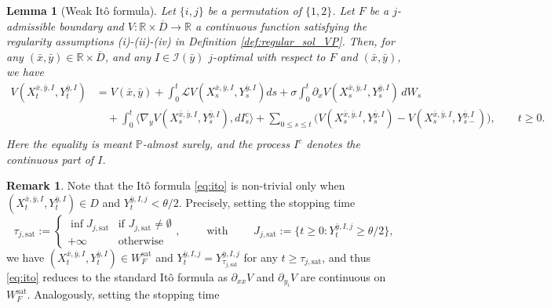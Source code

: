 \documentclass[10pt]{article}
\numberwithin{equation}{section}
\theoremstyle{plain}
\numberwithin{theorem}{section}
\newtheorem{lemma}[theorem]{Lemma}                              %
\theoremstyle{definition}
\newtheorem{remark}[theorem]{Remark}
\def \R {\mathbb{R}}
\newcommand{\<}{\langle}
\renewcommand{\>}{\rangle}
\renewcommand{\(}{\left(}
\renewcommand{\)}{\right)}
\newcommand\Pb{\mathbb{P}}
\def \R  {{\mathbb {R}}}
\def \R {{\mathbb {R}}}
\def\cI{{\mathcal I}}
\def\cL{{\mathcal L}}
\begin{document}
{{{\begin{lemma}[Weak It\^o formula]\label{lem:ito}
Let $\{i,j\}$ be a permutation of $\{ 1,2 \}$. Let $F$ be a $j$-admissible boundary and $V:\R\times \overline{D} \to \R$ a continuous function satisfying the regularity assumptions (i)-(ii)-{(iv)} in Definition \ref{def:regular_sol_VP}. Then, for any $(\bar x, \bar y)\in \R\times \overline{D}$, and any $I\in \cI(\bar y)$ {$j$-optimal with respect to $F$ and $(\bar x, \bar y)$}, we have
\begin{align}
 V(X^{\bar x,\bar y,I}_t, Y^{\bar y,I}_t) & = V({\bar x,\bar y}) + \int_{0}^t \cL V (X^{\bar{x},\bar{y},I}_s , Y^{\bar{y},I}_s ) ds + \sigma \int_0^t \partial_x V (X^{\bar{x},\bar{y},I}_s , Y^{\bar{y},I}_s )\, d W_s \\
& \quad + \int_0^t \big\langle \nabla_y V (X^{\bar{x},\bar{y},I}_s , Y^{\bar{y},I}_s ) , d I^c_s \big\rangle + \sum_{
{0\le s\le t}} \big( V (X^{\bar{x},\bar{y},I}_s , Y^{\bar{y},I}_s ) - V (X^{\bar{x},\bar{y},I}_s , Y^{\bar{y},I}_{s-} )  \big) , \qquad t\geq 0. \\
\label{eq:ito}
\end{align}
Here the equality is meant $\Pb$-almost surely, and the process $I^c$ denotes the continuous part of $I$.
\end{lemma}
\begin{remark}\label{rem:ito}
Note that the It\^o formula \eqref{eq:ito} is non-trivial only when $(X_t^{\bar x,\bar y,I},Y_t^{\bar y,I})\in D$ and $Y_t^{\bar y,I,j}<\theta/2$. Precisely, 
setting the stopping time
\begin{equation}\label{eq:tausat}
\tau_{j,\text{sat}}:=\begin{cases} 
\inf J_{j,\text{sat}}& \text{if } J_{j,\text{sat}} \neq \emptyset  \\
+\infty & \text{otherwise}
\end{cases}, \qquad \mbox{ with } \qquad J_{j,\text{sat}}:=  \{ t\geq0 : Y^{\bar y, I ,j}_t \geq \theta/2\}  ,
\end{equation}
we have $(X_t^{\bar x,\bar y,I},Y_t^{\bar y,I})\in  W_F^{\text{sat}}$ and $Y^{\bar y,I,j}_t = Y^{\bar y,I,j}_{\tau_{j,\text{sat}}}$ for any $t\geq \tau_{j,\text{sat}}$, and thus \eqref{eq:ito} reduces to the standard It\^o formula as $\partial_{xx}V$ and $\partial_{y_i}V$ are continuous on ${W_F^{\text{sat}}}$. Analogously, setting the stopping time
\begin{equation}\label{eq:tausat_bis}

\end{equation}
\end{remark}}}}
\end{document}
